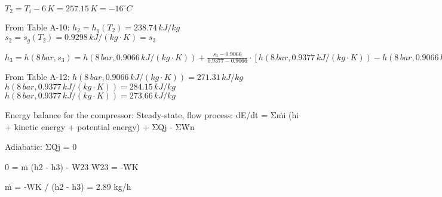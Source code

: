 \( T_2 = T_i - 6 \, K = 257.15 \, K = -16^\circ C \)  

From Table A-10:  
\( h_2 = h_{g}(T_2) = 238.74 \, kJ/kg \)  
\( s_2 = s_{g}(T_2) = 0.9298 \, kJ/(kg \cdot K) = s_3 \)  

\( h_3 = h(8 \, bar, s_3) = h(8 \, bar, 0.9066 \, kJ/(kg \cdot K)) + \frac{s_3 - 0.9066}{0.9377 - 0.9066} \cdot \left[ h(8 \, bar, 0.9377 \, kJ/(kg \cdot K)) - h(8 \, bar, 0.9066 \, kJ/(kg \cdot K)) \right] \)  

From Table A-12:  
\( h(8 \, bar, 0.9066 \, kJ/(kg \cdot K)) = 271.31 \, kJ/kg \)  
\( h(8 \, bar, 0.9377 \, kJ/(kg \cdot K)) = 284.15 \, kJ/kg \)  
\( h(8 \, bar, 0.9377 \, kJ/(kg \cdot K)) = 273.66 \, kJ/kg \)

Energy balance for the compressor:  
Steady-state, flow process:  
dE/dt = Σṁi (hi + kinetic energy + potential energy) + ΣQ̇j - ΣẆn  

Adiabatic:  
ΣQ̇j = 0  

0 = ṁ (h2 - h3) - Ẇ23  
Ẇ23 = -ẆK  

ṁ = -WK / (h2 - h3) = 2.89 kg/h